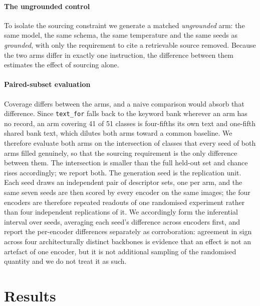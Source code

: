 \documentclass[a4paper,fleqn]{cas-dc}
\begin{document}
\paragraph{The ungrounded control} To isolate the sourcing constraint we generate a matched
\emph{ungrounded} arm: the same model, the same schema, the same temperature and the same seeds as
\emph{grounded}, with only the requirement to cite a retrievable source removed. Because the two arms
differ in exactly one instruction, the difference between them estimates the effect of sourcing
alone.

\paragraph{Paired-subset evaluation} Coverage differs between the arms, and a naive comparison would
absorb that difference. Since \texttt{text\_for} falls back to the keyword bank wherever an arm has
no record, an arm covering 41 of 51 classes is four-fifths its own text and one-fifth shared bank
text, which dilutes both arms toward a common baseline. We therefore evaluate both arms on the
intersection of classes that every seed of both arms filled genuinely, so that the sourcing
requirement is the only difference between them. The intersection is smaller than the full held-out
set and chance rises accordingly; we report both. %
The generation seed is the replication unit. Each seed draws an independent pair of
descriptor sets, one per arm, and the same seven seeds are then scored by every encoder on
the same images; the four encoders are therefore repeated readouts of one randomised
experiment rather than four independent replications of it. We accordingly form the
inferential interval over seeds, averaging each seed's difference across encoders first, and
report the per-encoder differences separately as corroboration: agreement in sign across
four architecturally distinct backbones is evidence that an effect is not an artefact of one
encoder, but it is not additional sampling of the randomised quantity and we do not treat it
as such.

\section{Results}
\end{document}
